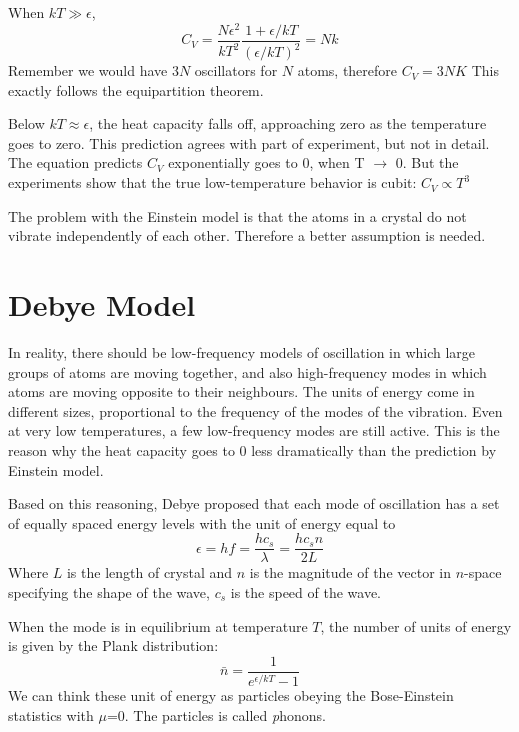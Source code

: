 When $kT \gg \epsilon$,
\begin{equation}
C_V = \frac{N\epsilon^2}{kT^2} \frac{1+ \epsilon/kT} {(\epsilon/kT)^2} = Nk
\end{equation}
Remember we would have 3$N$ oscillators for $N$ atoms, therefore $C_V = 3NK$
This exactly follows the equipartition theorem. 

Below $kT \approx \epsilon$, the heat capacity falls off, approaching zero as the temperature goes to zero. This
prediction agrees with part of experiment, but not in detail. 
The equation predicts $C_V$ exponentially goes to 0, when T $\rightarrow$ 0. But the experiments show that the true low-temperature behavior is cubit: $C_V \propto T^3$

The problem with the Einstein model is that the atoms in a crystal do not vibrate independently of each other. Therefore a better assumption is needed.

\section{Debye Model}
In reality, there should be low-frequency models of oscillation in which large groups of atoms are moving together, and also
high-frequency modes in which atoms are moving opposite to their neighbours.
The units of energy come in different sizes, proportional to the frequency of the modes of the vibration.
Even at very low temperatures, a few low-frequency modes are still active. 
This is the reason why the heat capacity goes to 0 less dramatically than the prediction by Einstein model.


Based on this reasoning, Debye proposed that each mode of oscillation has a set of equally spaced energy levels with the unit of energy equal to
\begin{equation}
\epsilon = hf = \frac{hc_s}{\lambda}=\frac{hc_sn}{2L}
\end{equation}
Where $L$ is the length of crystal and $n$ is the magnitude of the vector in $n$-space specifying the shape of the wave, $c_s$ is the speed of the wave.

When the mode is in equilibrium at temperature $T$, the number of units of energy is given by the Plank distribution:
\begin{equation} 
\bar{n} = \frac{1}{e^{\epsilon/kT}-1}
\end{equation} 
We can think these unit of energy as particles obeying the Bose-Einstein statistics with $\mu$=0. The particles is called {\emph phonons}.

